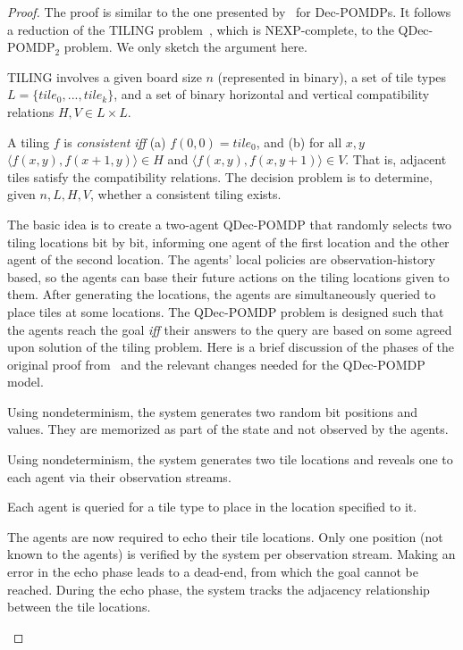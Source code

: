 \documentclass[letterpaper]{article}
\theoremstyle{definition}
\begin{document}
\begin{proof}
The proof is similar to the one presented by~\cite{Bernstein02} for Dec-POMDPs.  It follows a reduction of the TILING problem~\cite{Lewis78,Papadimitriou94}, which is NEXP-complete, to the QDec-POMDP$_2$ problem.  We only sketch the argument here.

TILING involves a given board size $n$ (represented in binary), a set of tile types $L \!=\! \{tile_0, ..., tile_k\}$,
and a set of binary horizontal and vertical compatibility relations $H, V \!\in\! L \!\times\! L$.

A tiling $f$ is \emph{consistent} \emph{iff}
(a) $f(0,0) = tile_0$, and (b) for all $x,y$ $\langle  f(x,y), f(x+1,y) \rangle \in H$ and
$\langle  f(x,y), f(x,y+1) \rangle \in V$.  That is, adjacent tiles satisfy the compatibility relations.
The decision problem is to determine, given $n, L, H, V$, whether a consistent tiling exists.

The basic idea is to create a two-agent QDec-POMDP that randomly selects two tiling locations bit by bit, informing one agent of the first location and the other agent of the second location. The agents' local policies are observation-history based, so the agents can base their future actions on the tiling locations given to them.  After generating the locations, the agents are simultaneously queried to place tiles at some locations. The QDec-POMDP problem is designed such that the agents reach the goal \emph{iff} their answers to the query are based on some agreed upon solution of the tiling problem.  Here is a brief discussion of the phases of the original proof from~\cite{Bernstein02} and the relevant changes needed for the QDec-POMDP model.

\begin{description}
\setlength{\itemsep}{0pt}
\item [Select Phase]  Using nondeterminism, the system generates two random bit positions and values.  They are memorized as part of the state and not observed by the agents.

\item [Generate Phase] Using nondeterminism, the system generates two tile locations and reveals one to each agent via their observation streams.

\item [Query Phase] Each agent is queried for a tile type to place in the location specified to it.

\item [Echo Phase] The agents are now required to echo their tile locations.  Only one position (not known to the agents) is verified by the system per observation stream.  Making an error in the echo phase leads to a dead-end, from which the goal cannot be reached.  During the echo phase, the system tracks the adjacency relationship between the tile locations.


\end{description}
\end{proof}
\end{document}
